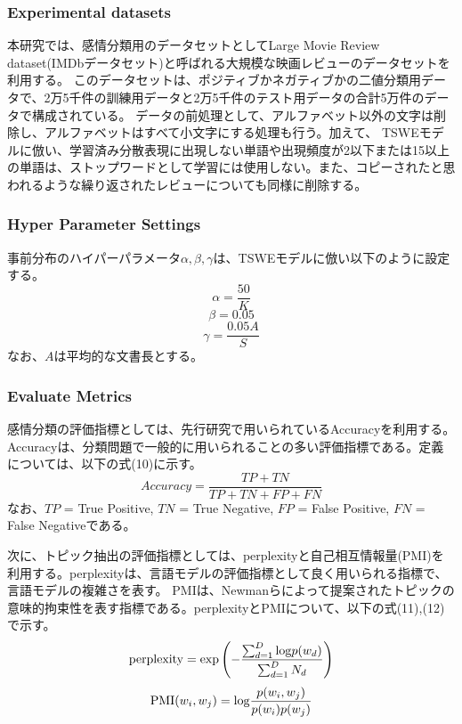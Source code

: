 \documentclass[uplatex]{jsarticle}
\begin{document}
\subsubsection{Experimental datasets}
本研究では、感情分類用のデータセットとしてLarge Movie Review dataset(IMDbデータセット)\cite{IMDb}と呼ばれる大規模な映画レビューのデータセットを利用する。
このデータセットは、ポジティブかネガティブかの二値分類用データで、2万5千件の訓練用データと2万5千件のテスト用データの合計5万件のデータで構成されている。
データの前処理として、アルファベット以外の文字は削除し、アルファベットはすべて小文字にする処理も行う。加えて、
TSWEモデルに倣い、学習済み分散表現に出現しない単語や出現頻度が2以下または15以上の単語は、ストップワードとして学習には使用しない。また、コピーされたと思われるような繰り返されたレビューについても同様に削除する。
\subsubsection{Hyper Parameter Settings}
事前分布のハイパーパラメータ$\alpha, \beta, \gamma$は、TSWEモデルに倣い以下のように設定する。
\begin{equation}
    \alpha = \frac{50}{K}
\end{equation}
\begin{equation}
    \beta = 0.05
\end{equation}
\begin{equation}
    \gamma = \frac{0.05A}{S}
\end{equation}
なお、$A$は平均的な文書長とする。
\subsubsection{Evaluate Metrics}
感情分類の評価指標としては、先行研究\cite{JST,TSWE}で用いられているAccuracyを利用する。Accuracyは、分類問題で一般的に用いられることの多い評価指標である。定義については、以下の式(10)に示す。
\begin{equation}
    Accuracy = \frac{TP + TN}{TP + TN + FP + FN}
\end{equation}
なお、$TP$ = True Positive, $TN$ = True Negative, $FP$ = False Positive, $FN$ = False Negativeである。

次に、トピック抽出の評価指標としては、perplexityと自己相互情報量(PMI)を利用する。perplexityは、言語モデルの評価指標として良く用いられる指標で、言語モデルの複雑さを表す。
PMIは、Newmanら\cite{PMI}によって提案されたトピックの意味的拘束性を表す指標である。perplexityとPMIについて、以下の式(11),(12)で示す。
\begin{equation}
    {\rm perplexity} = {\rm exp}\left(-\frac{\sum_{d=1}^{D}{\rm log}p(w_{d})}{\sum_{d=1}^{D}N_{d}} \right)
\end{equation}
\begin{equation}
    {\rm PMI}(w_{i},w_{j}) = {\rm log} \frac{p(w_{i},w_{j})}{p(w_{i})p(w_{j})}
\end{equation}
\end{document}
